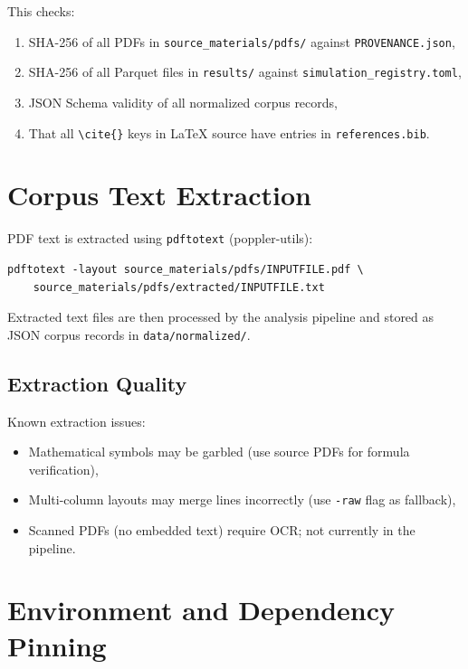 This checks:
\begin{enumerate}
    \item SHA-256 of all PDFs in \texttt{source\_materials/pdfs/} against
          \texttt{PROVENANCE.json},
    \item SHA-256 of all Parquet files in \texttt{results/} against
          \texttt{simulation\_registry.toml},
    \item JSON Schema validity of all normalized corpus records,
    \item That all \verb|\cite{}| keys in LaTeX source have entries in
          \texttt{references.bib}.
\end{enumerate}

\section{Corpus Text Extraction}
\label{app:corpus_extraction}

PDF text is extracted using \texttt{pdftotext} (poppler-utils):
\begin{verbatim}
pdftotext -layout source_materials/pdfs/INPUTFILE.pdf \
    source_materials/pdfs/extracted/INPUTFILE.txt
\end{verbatim}

Extracted text files are then processed by the analysis pipeline and
stored as JSON corpus records in \texttt{data/normalized/}.

\subsection{Extraction Quality}

Known extraction issues:
\begin{itemize}
    \item Mathematical symbols may be garbled (use source PDFs for
          formula verification),
    \item Multi-column layouts may merge lines incorrectly (use
          \texttt{-raw} flag as fallback),
    \item Scanned PDFs (no embedded text) require OCR; not currently
          in the pipeline.
\end{itemize}

\section{Environment and Dependency Pinning}
\label{app:deps}


